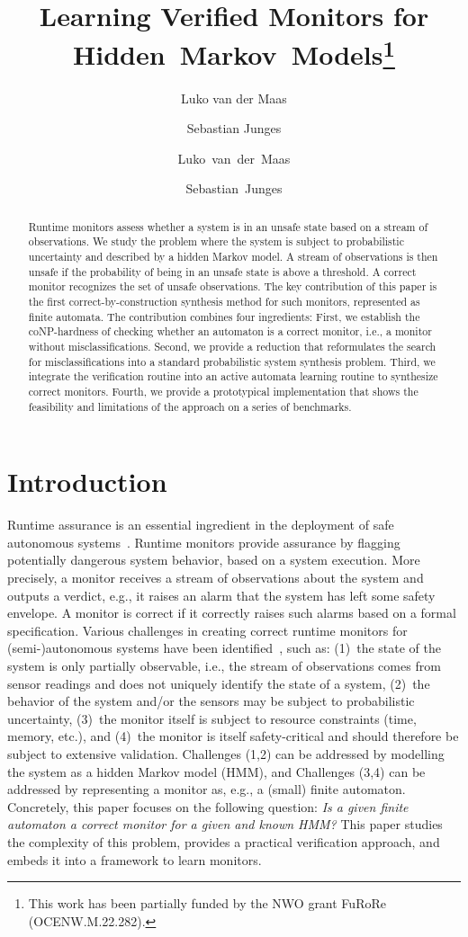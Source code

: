 \documentclass[runningheads]{llncs}
\title{Learning Verified Monitors for Hidden~Markov~Models\thanks{This work has been partially funded by the NWO grant FuRoRe (OCENW.M.22.282).}}
\author{Luko van der Maas \and Sebastian Junges }
\institute{Radboud University, Nijmegen, the Netherlands}
\author{%
 Luko~van~der~Maas \orcidlink{0009-0007-3915-6191} \and Sebastian~Junges \orcidlink{0000-0003-0978-8466}
}
\institute{Radboud University, Nijmegen, the Netherlands\\ \email{\{luko.vandermaas,sebastian.junges\}@ru.nl}}
\begin{document}
\maketitle
\begin{abstract}
    Runtime monitors assess whether a system is in an unsafe state based on a stream of observations. We study the problem where the system is subject to probabilistic uncertainty and described by a hidden Markov model. A stream of observations is then unsafe if the probability of being in an unsafe state is above a threshold. A correct monitor recognizes the set of unsafe observations. The key contribution of this paper is the first correct-by-construction synthesis method for such monitors, represented as finite automata. The contribution combines four ingredients: First, we establish the coNP-hardness of checking whether an automaton is a correct monitor, i.e., a monitor without misclassifications. Second, we provide a reduction that reformulates the search for misclassifications into a standard probabilistic system synthesis problem. Third, we integrate the verification routine into an active automata learning routine to synthesize correct monitors. Fourth, we provide a prototypical implementation that shows the feasibility and limitations of the approach on a series of benchmarks.
\end{abstract}

\section{Introduction}
\noindent
Runtime assurance is an essential ingredient in the deployment of safe autonomous systems~\cite{bartocciLecturesRuntimeVerification2018,sanchezSurveyChallengesRuntime2019}.
Runtime monitors provide assurance by flagging potentially dangerous system behavior, based on a system execution.
More precisely, a monitor receives a stream of observations about the system and outputs a verdict, e.g., it raises an alarm that the system has left some safety envelope. A monitor is correct if it correctly raises such alarms based on a formal specification.
Various challenges in creating correct runtime monitors for (semi-)autonomous systems have been identified~\cite{sanchezSurveyChallengesRuntime2019}, such as:
(1)~the state of the system is only partially observable, i.e., the stream of observations comes from sensor readings and does not uniquely identify the state of a system,
(2)~the behavior of the system and/or the sensors may be subject to probabilistic uncertainty,
(3)~the monitor itself is subject to resource constraints (time, memory, etc.), and
(4)~the monitor is itself safety-critical and should therefore be subject to extensive validation.
Challenges (1,2) can be addressed  by modelling the system as a hidden Markov model (HMM), and Challenges (3,4) can be addressed by representing a monitor as, e.g., a (small) finite automaton.
Concretely, this paper focuses on the following question:
\emph{Is a given finite automaton a correct monitor for a given and known HMM?}
This paper studies the complexity of this problem, provides a practical verification approach, and embeds it into a framework to learn monitors.
\end{document}
